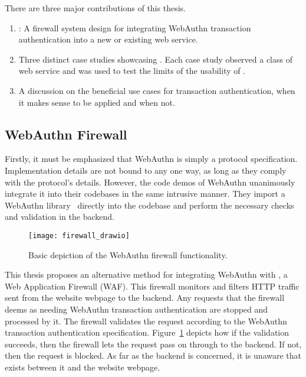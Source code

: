 There are three major contributions of this thesis. 

\begin{enumerate}[nosep]

\item \sys{}: A firewall system design for integrating WebAuthn transaction authentication into a new or existing web service.

\item Three distinct case studies showcasing \sys{}. Each case study observed a class of web service and was used to test the limits of the usability of \sys{}.

\item A discussion on the beneficial use cases for transaction authentication, when it makes sense to be applied and when not.

\end{enumerate}


\subsection{WebAuthn Firewall}

Firstly, it must be emphasized that WebAuthn is simply a protocol specification. Implementation details are not bound to any one way, as long as they comply with the protocol's details. However, the code demos of WebAuthn unanimously integrate it into their codebases in the same intrusive manner. They import a WebAuthn library~\cite{webauthn-library} directly into the codebase and perform the necessary checks and validation in the backend.

\begin{figure}[h]
  \centering
  \texttt{[image: firewall\_drawio]}
  \caption{Basic depiction of the WebAuthn firewall functionality.}
  \label{Fig:BasicFirewallDepiction}
\end{figure}

This thesis proposes an alternative method for integrating WebAuthn with \sys{}, a Web Application Firewall (WAF). This firewall monitors and filters HTTP traffic sent from the website webpage to the backend. Any requests that the firewall deems as needing WebAuthn transaction authentication are stopped and processed by it. The firewall validates the request according to the WebAuthn transaction authentication specification. Figure~\ref{Fig:BasicFirewallDepiction} depicts how if the validation succeeds, then the firewall lets the request pass on through to the backend. If not, then the request is blocked. As far as the backend is concerned, it is unaware that \sys{} exists between it and the website webpage. 

